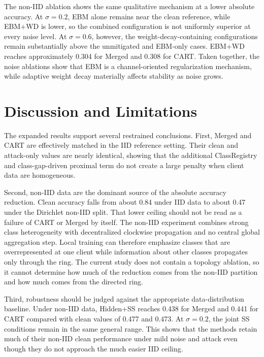 \documentclass[conference]{IEEEtran}
\begin{document}
The non-IID ablation shows the same qualitative mechanism at a lower absolute accuracy. At $\sigma=0.2$, EBM alone remains near the clean reference, while EBM+WD is lower, so the combined configuration is not uniformly superior at every noise level. At $\sigma=0.6$, however, the weight-decay-containing configurations remain substantially above the unmitigated and EBM-only cases. EBM+WD reaches approximately 0.304 for Merged and 0.308 for CART. Taken together, the noise ablations show that EBM is a channel-oriented regularization mechanism, while adaptive weight decay materially affects stability as noise grows.

\FloatBarrier
\section{Discussion and Limitations}

The expanded results support several restrained conclusions. First, Merged and CART are effectively matched in the IID reference setting. Their clean and attack-only values are nearly identical, showing that the additional ClassRegistry and class-gap-driven proximal term do not create a large penalty when client data are homogeneous.

Second, non-IID data are the dominant source of the absolute accuracy reduction. Clean accuracy falls from about 0.84 under IID data to about 0.47 under the Dirichlet non-IID split. That lower ceiling should not be read as a failure of CART or Merged by itself. The non-IID experiment combines strong class heterogeneity with decentralized clockwise propagation and no central global aggregation step. Local training can therefore emphasize classes that are overrepresented at one client while information about other classes propagates only through the ring. The current study does not contain a topology ablation, so it cannot determine how much of the reduction comes from the non-IID partition and how much comes from the directed ring.

Third, robustness should be judged against the appropriate data-distribution baseline. Under non-IID data, Hidden+SS reaches 0.438 for Merged and 0.441 for CART compared with clean values of 0.477 and 0.473. At $\sigma=0.2$, the joint SS conditions remain in the same general range. This shows that the methods retain much of their non-IID clean performance under mild noise and attack even though they do not approach the much easier IID ceiling.
\end{document}
